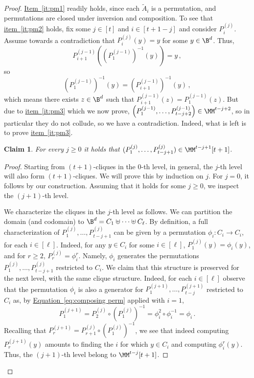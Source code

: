 \documentclass[11pt]{article}
\numberwithin{equation}{section}
\newtheorem{claim}[theorem]{Claim}
\theoremstyle{definition}
\theoremstyle{plain}
\newcommand{\expeqref}[2]{\hyperref[#2]{#1~\eqref{#2}}}
\begin{document}
\begin{proof}
\expeqref{Item}{it:pm1} readily holds, since each $\widetilde{A}_i$ is a permutation, and permutations are closed
under inversion and composition. To see that \expeqref{item}{it:pm2} holds, fix some
$j \in [t]$ and $i \in [t+1-j]$ and consider $P_{i}^{(j)}$. Assume
towards a contradiction that $P_{i}^{(j)}(y) = y$ for some $y \in \B^d$. Thus,
\[
P_{i+1}^{(j-1)} \left( \left(P_{1}^{(j-1)}\right)^{-1}(y)\right) = y\,,
\]
so
\[
\left(P_{1}^{(j-1)}\right)^{-1}(y) = \left( P_{i+1}^{(j-1)} \right)^{-1}(y)\,,
\]
which means there exists $z \in \B^d$ such that $P_{i+1}^{(j-1)}(z) = P_{1}^{(j-1)}(z)$.
But due to \expeqref{item}{it:pm3} which we now prove, $\left( P_{1}^{(j-1)},\ldots,P_{t-j+2}^{(j-1)} \right) \in \MM^{t-j+2}$,
so in particular they do not collude, so we have a contradiction. Indeed, what is left is 
to prove \expeqref{item}{it:pm3}.
\begin{claim}
For every $j \ge 0$ it holds that $( P_{1}^{(j)},\ldots,P_{t-j+1}^{(j)} ) \in \MM^{t-j+1}[t+1]$.
\end{claim}
\begin{proof}
Starting from $(t+1)$-cliques in the $0$-th level, in general, the $j$-th level
will also form $(t+1)$-cliques. We will prove this by induction on $j$. For $j = 0$, it follows
by our construction. Assuming that it holds for some $j \ge 0$, we inspect the $(j+1)$-th level.

We characterize the cliques in the $j$-th level as follows. We can partition the domain (and codomain)
to $\B^d = C_1 \uplus \cdots \uplus C_{\ell}$. By definition, a full characterization of
$P_1^{(j)},\ldots,P_{t-j+1}^{(j)}$ can be given by a permutation
$\phi_i \colon C_i \rightarrow C_i$, for each $i \in [\ell]$. Indeed, 
for any $y \in C_i$ for some $i \in [\ell]$, $P_{1}^{(j)}(y) = \phi_{i}(y)$, and
for $r \ge 2$, $P_{r}^{(j)} = \phi_{i}^r$. Namely, $\phi_i$ generates the permutations $P_1^{(j)},\ldots,P_{t-j+1}^{(j)}$ restricted to $C_i$.
We claim that this structure is preserved for the next level, with the same clique structure. Indeed, for each $i \in [\ell]$ observe that the permutation ${\phi}_i$ is also a generator for $P_1^{(j+1)},\ldots,P_{t-j}^{(j+1)}$ restricted to $C_i$ as, by \expeqref{Equation}{eq:composing perm} applied with $i=1$,
\[
P^{(j+1)}_{1} = P_{2}^{(j)} \circ \left( P_{1}^{(j)} \right)^{-1} = \phi_i^2 \circ \phi_i^{-1} = \phi_i\,.
\]
%
%
%
Recalling that $P^{(j+1)}_{r} = P_{r+1}^{(j)} \circ \left( P_{1}^{(j)} \right)^{-1}$, we see that indeed
computing $P^{(j+1)}_{r}(y)$ amounts to finding the $i$ for which $y \in C_i$
and computing $\phi_i^r(y)$. Thus, the $(j+1)$-th level belong to $\MM^{t-j}[t+1]$.
\end{proof}
\end{proof}
\end{document}
